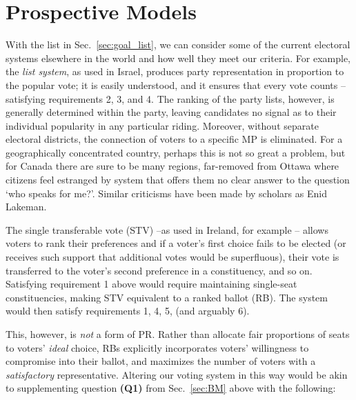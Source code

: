
\section{Prospective Models}
\label{sec:alt_models}

With the list in Sec.~\ref{sec:goal_list}, we can consider some of the current electoral systems elsewhere in the world and how well they meet our criteria. For example, the \emph{list system}, as used in Israel, produces party representation in proportion to the popular vote; it is easily understood, and it ensures that every vote counts \---satisfying requirements 2, 3, and 4.
The ranking of the party lists, however, is generally determined within the party, leaving candidates no signal as to their individual popularity in any particular riding. Moreover, without separate electoral districts, the connection of voters to a specific MP is eliminated.
For a geographically concentrated country, perhaps this is not so great a problem, but for Canada there are sure to be many regions, far-removed from Ottawa where citizens feel estranged by system that offers them no clear answer to the question `who speaks for me?'. Similar criticisms have been made by scholars as Enid Lakeman\cite{Lakeman}.

The single transferable vote (STV) \---as used in Ireland, for example\cite{Irish_howto_vote_doc}
\--- allows voters to  rank their preferences and if a voter's first choice fails to be elected (or receives such support that additional votes would be superfluous), their vote is transferred to the voter's second preference in a constituency, and so on.
Satisfying requirement 1 above would require maintaining single-seat constituencies, making STV equivalent to a ranked ballot (RB). The system would then satisfy requirements 1, 4, 5, (and arguably 6).

This, however, is \emph{not} a form of PR.
Rather than allocate fair proportions of seats to voters' \emph{ideal} choice, RBs explicitly incorporates voters' willingness to compromise into their ballot, and maximizes the number of voters with a \emph{satisfactory} representative.
Altering our voting system in this way would be akin to supplementing question \textbf{(Q1)} from Sec.~\ref{sec:BM} above with the following:

